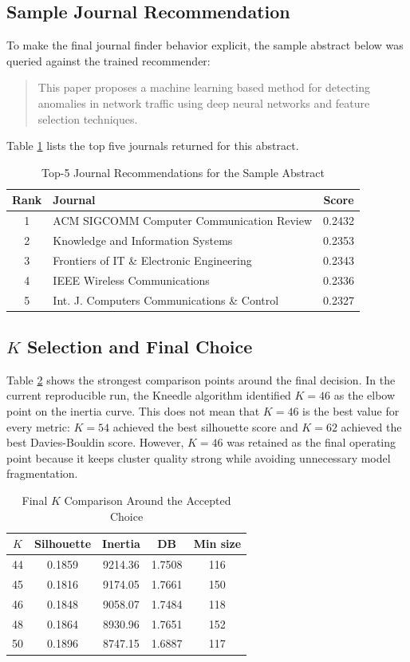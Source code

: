 \documentclass[conference]{IEEEtran}
\begin{document}
\subsection{Sample Journal Recommendation}
To make the final journal finder behavior explicit, the sample abstract below was queried against the trained recommender:
\begin{quote}
\footnotesize
This paper proposes a machine learning based method for detecting anomalies in network traffic using deep neural networks and feature selection techniques.
\end{quote}
Table \ref{tab:sample_recs} lists the top five journals returned for this abstract.

\begin{table}[!t]
\caption{Top-5 Journal Recommendations for the Sample Abstract}
\label{tab:sample_recs}
\centering
\footnotesize
\begin{tabular}{clc}
\toprule
Rank & Journal & Score \\
\midrule
1 & ACM SIGCOMM Computer Communication Review & 0.2432 \\
2 & Knowledge and Information Systems & 0.2353 \\
3 & Frontiers of IT \& Electronic Engineering & 0.2343 \\
4 & IEEE Wireless Communications & 0.2336 \\
5 & Int. J. Computers Communications \& Control & 0.2327 \\
\bottomrule
\end{tabular}
\end{table}

\subsection{$K$ Selection and Final Choice}
Table \ref{tab:kcompare} shows the strongest comparison points around the final decision. In the current reproducible run, the Kneedle algorithm identified $K=46$ as the elbow point on the inertia curve. This does not mean that $K=46$ is the best value for every metric: $K=54$ achieved the best silhouette score and $K=62$ achieved the best Davies-Bouldin score. However, $K=46$ was retained as the final operating point because it keeps cluster quality strong while avoiding unnecessary model fragmentation.

\begin{table}[!t]
\caption{Final $K$ Comparison Around the Accepted Choice}
\label{tab:kcompare}
\centering
\footnotesize
\begin{tabular}{ccccc}
\toprule
$K$ & Silhouette & Inertia & DB & Min size \\
\midrule
44 & 0.1859 & 9214.36 & 1.7508 & 116 \\
45 & 0.1816 & 9174.05 & 1.7661 & 150 \\
46 & 0.1848 & 9058.07 & 1.7484 & 118 \\
48 & 0.1864 & 8930.96 & 1.7651 & 152 \\
50 & 0.1896 & 8747.15 & 1.6887 & 117 \\
\bottomrule
\end{tabular}
\end{table}
\end{document}
